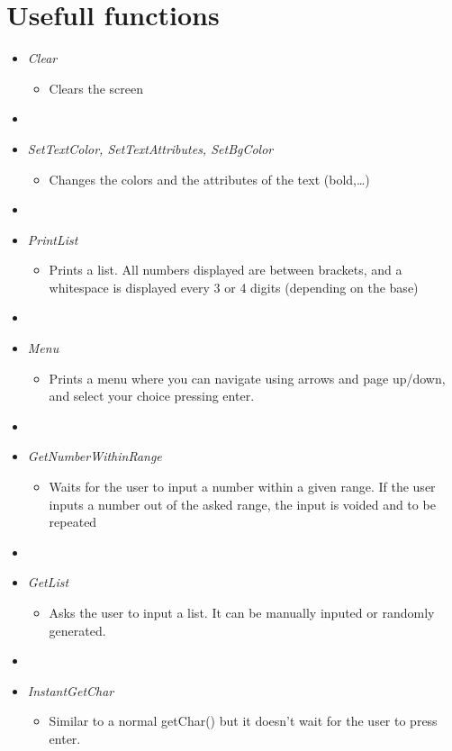 \documentclass[book, backcover, english, nodocumentinfo]{upmethodology-document}
\begin{document}
	\section{Usefull functions}
		\begin{itemize}
			\item{}\textit{Clear}
				\begin{itemize}
					\item[]{} Clears the screen
				\end{itemize}
				\item[]{}
			\item{}\textit{SetTextColor, SetTextAttributes, SetBgColor}
				\begin{itemize}
					\item[]{} Changes the colors and the attributes of the text (bold,\ldots)
				\end{itemize}
				\item[]{}
			\item{}\textit{PrintList}
				\begin{itemize}
					\item[]{} Prints a list. All numbers displayed are between brackets, and a whitespace is displayed every 3 or 4 digits (depending on the base)
				\end{itemize}
				\item[]{}
			\item{}\textit{Menu}
				\begin{itemize}
					\item[]{} Prints a menu where you can navigate using arrows and page up/down, and select your choice pressing enter.
				\end{itemize}
				\item[]{}
			\item{}\textit{GetNumberWithinRange}
				\begin{itemize}
					\item[]{} Waits for the user to input a number within a given range. If the user inputs a number out of the asked range, the input is voided and to be repeated
				\end{itemize}
				\item[]{}
			\item{}\textit{GetList}
				\begin{itemize}
					\item[]{} Asks the user to input a list. It can be manually inputed or randomly generated.
				\end{itemize}
				\item[]{}
			\item{} \textit{InstantGetChar}
				\begin{itemize}
					\item[]{} Similar to a normal getChar() but it doesn't wait for the user to press enter.
				\end{itemize}
		\end{itemize}
\end{document}
